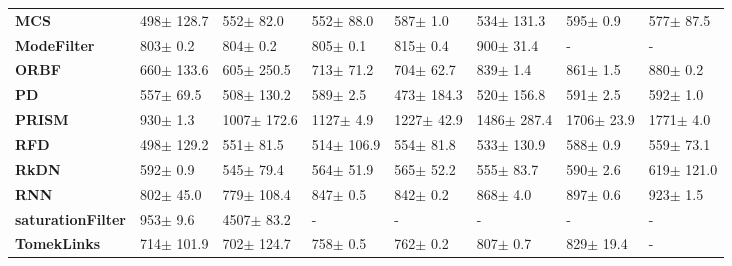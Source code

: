 \begin{tabular}{llllllll}
\textbf{MCS             } &    498$\pm$ 128.7 &    552$\pm$ 82.0 &    552$\pm$ 88.0 &       587$\pm$ 1.0 &   534$\pm$ 131.3 &     595$\pm$ 0.9 &    577$\pm$ 87.5 \\
\textbf{ModeFilter      } &      803$\pm$ 0.2 &     804$\pm$ 0.2 &     805$\pm$ 0.1 &       815$\pm$ 0.4 &    900$\pm$ 31.4 &                - &                - \\
\textbf{ORBF            } &    660$\pm$ 133.6 &   605$\pm$ 250.5 &    713$\pm$ 71.2 &      704$\pm$ 62.7 &     839$\pm$ 1.4 &     861$\pm$ 1.5 &     880$\pm$ 0.2 \\
\textbf{PD              } &     557$\pm$ 69.5 &   508$\pm$ 130.2 &     589$\pm$ 2.5 &     473$\pm$ 184.3 &   520$\pm$ 156.8 &     591$\pm$ 2.5 &     592$\pm$ 1.0 \\
\textbf{PRISM           } &      930$\pm$ 1.3 &  1007$\pm$ 172.6 &    1127$\pm$ 4.9 &     1227$\pm$ 42.9 &  1486$\pm$ 287.4 &   1706$\pm$ 23.9 &    1771$\pm$ 4.0 \\
\textbf{RFD             } &    498$\pm$ 129.2 &    551$\pm$ 81.5 &   514$\pm$ 106.9 &      554$\pm$ 81.8 &   533$\pm$ 130.9 &     588$\pm$ 0.9 &    559$\pm$ 73.1 \\
\textbf{RkDN            } &      592$\pm$ 0.9 &    545$\pm$ 79.4 &    564$\pm$ 51.9 &      565$\pm$ 52.2 &    555$\pm$ 83.7 &     590$\pm$ 2.6 &   619$\pm$ 121.0 \\
\textbf{RNN             } &     802$\pm$ 45.0 &   779$\pm$ 108.4 &     847$\pm$ 0.5 &       842$\pm$ 0.2 &     868$\pm$ 4.0 &     897$\pm$ 0.6 &     923$\pm$ 1.5 \\
\textbf{saturationFilter} &      953$\pm$ 9.6 &   4507$\pm$ 83.2 &                - &                  - &                - &                - &                - \\
\textbf{TomekLinks      } &    714$\pm$ 101.9 &   702$\pm$ 124.7 &     758$\pm$ 0.5 &       762$\pm$ 0.2 &     807$\pm$ 0.7 &    829$\pm$ 19.4 &                - \\
\bottomrule
\end{tabular}
